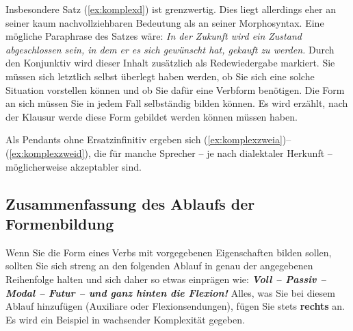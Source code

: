 Insbesondere Satz (\ref{ex:komplexd}) ist grenzwertig.
Dies liegt allerdings eher an seiner kaum nachvollziehbaren Bedeutung als an seiner Morphosyntax.
Eine mögliche Paraphrase des Satzes wäre:
\textit{In der Zukunft wird ein Zustand abgeschlossen sein, in dem er es sich gewünscht hat, gekauft zu werden.}
Durch den Konjunktiv wird dieser Inhalt zusätzlich als Redewiedergabe markiert.
Sie müssen sich letztlich selbst überlegt haben werden, ob Sie sich eine solche Situation vorstellen können und ob Sie dafür eine Verbform benötigen.
Die Form an sich müssen Sie in jedem Fall selbständig bilden können.
Es wird erzählt, nach der Klausur werde diese Form gebildet werden können müssen haben.

Als Pendants ohne Ersatzinfinitiv ergeben sich (\ref{ex:komplexzweia})--(\ref{ex:komplexzweid}), die für manche Sprecher -- je nach dialektaler Herkunft -- möglicherweise akzeptabler sind.

\begin{exe}
\end{exe}

\subsection{Zusammenfassung des Ablaufs der Formenbildung}

Wenn Sie die Form eines Verbs mit vorgegebenen Eigenschaften bilden sollen, sollten Sie sich streng an den folgenden Ablauf in genau der angegebenen Reihenfolge halten und sich daher so etwas einprägen wie: \textit{\textbf{Voll -- Passiv -- Modal -- Futur -- und ganz hinten die Flexion!}}
Alles, was Sie bei diesem Ablauf hinzufügen (Auxiliare oder Flexionsendungen), fügen Sie stets \textbf{rechts} an.
Es wird ein Beispiel in wachsender Komplexität gegeben.

